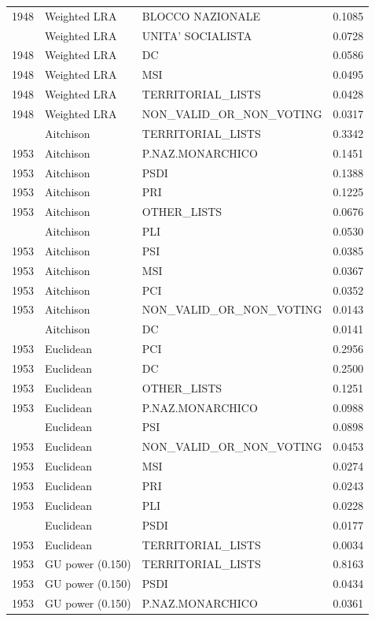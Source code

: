 \begin{longtable}[t]{rllr}
1948 & Weighted LRA & BLOCCO NAZIONALE & 0.1085\\
\addlinespace
1948 & Weighted LRA & UNITA' SOCIALISTA & 0.0728\\
1948 & Weighted LRA & DC & 0.0586\\
1948 & Weighted LRA & MSI & 0.0495\\
1948 & Weighted LRA & TERRITORIAL\_LISTS & 0.0428\\
1948 & Weighted LRA & NON\_VALID\_OR\_NON\_VOTING & 0.0317\\
\addlinespace
1953 & Aitchison & TERRITORIAL\_LISTS & 0.3342\\
1953 & Aitchison & P.NAZ.MONARCHICO & 0.1451\\
1953 & Aitchison & PSDI & 0.1388\\
1953 & Aitchison & PRI & 0.1225\\
1953 & Aitchison & OTHER\_LISTS & 0.0676\\
\addlinespace
1953 & Aitchison & PLI & 0.0530\\
1953 & Aitchison & PSI & 0.0385\\
1953 & Aitchison & MSI & 0.0367\\
1953 & Aitchison & PCI & 0.0352\\
1953 & Aitchison & NON\_VALID\_OR\_NON\_VOTING & 0.0143\\
\addlinespace
1953 & Aitchison & DC & 0.0141\\
1953 & Euclidean & PCI & 0.2956\\
1953 & Euclidean & DC & 0.2500\\
1953 & Euclidean & OTHER\_LISTS & 0.1251\\
1953 & Euclidean & P.NAZ.MONARCHICO & 0.0988\\
\addlinespace
1953 & Euclidean & PSI & 0.0898\\
1953 & Euclidean & NON\_VALID\_OR\_NON\_VOTING & 0.0453\\
1953 & Euclidean & MSI & 0.0274\\
1953 & Euclidean & PRI & 0.0243\\
1953 & Euclidean & PLI & 0.0228\\
\addlinespace
1953 & Euclidean & PSDI & 0.0177\\
1953 & Euclidean & TERRITORIAL\_LISTS & 0.0034\\
1953 & GU power (0.150) & TERRITORIAL\_LISTS & 0.8163\\
1953 & GU power (0.150) & PSDI & 0.0434\\
1953 & GU power (0.150) & P.NAZ.MONARCHICO & 0.0361\\

\end{longtable}
